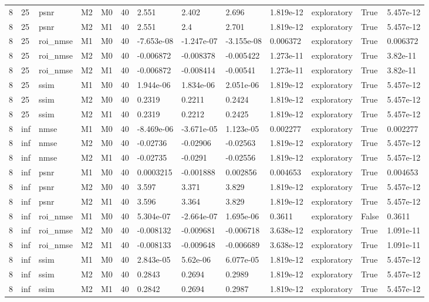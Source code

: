 \begin{tabular}{lllllllllllll}
8 & 25 & psnr & M2 & M0 & 40 & 2.551 & 2.402 & 2.696 & 1.819e-12 & exploratory & True & 5.457e-12 \\
8 & 25 & psnr & M2 & M1 & 40 & 2.551 & 2.4 & 2.701 & 1.819e-12 & exploratory & True & 5.457e-12 \\
8 & 25 & roi\_nmse & M1 & M0 & 40 & -7.653e-08 & -1.247e-07 & -3.155e-08 & 0.006372 & exploratory & True & 0.006372 \\
8 & 25 & roi\_nmse & M2 & M0 & 40 & -0.006872 & -0.008378 & -0.005422 & 1.273e-11 & exploratory & True & 3.82e-11 \\
8 & 25 & roi\_nmse & M2 & M1 & 40 & -0.006872 & -0.008414 & -0.00541 & 1.273e-11 & exploratory & True & 3.82e-11 \\
8 & 25 & ssim & M1 & M0 & 40 & 1.944e-06 & 1.834e-06 & 2.051e-06 & 1.819e-12 & exploratory & True & 5.457e-12 \\
8 & 25 & ssim & M2 & M0 & 40 & 0.2319 & 0.2211 & 0.2424 & 1.819e-12 & exploratory & True & 5.457e-12 \\
8 & 25 & ssim & M2 & M1 & 40 & 0.2319 & 0.2212 & 0.2425 & 1.819e-12 & exploratory & True & 5.457e-12 \\
8 & inf & nmse & M1 & M0 & 40 & -8.469e-06 & -3.671e-05 & 1.123e-05 & 0.002277 & exploratory & True & 0.002277 \\
8 & inf & nmse & M2 & M0 & 40 & -0.02736 & -0.02906 & -0.02563 & 1.819e-12 & exploratory & True & 5.457e-12 \\
8 & inf & nmse & M2 & M1 & 40 & -0.02735 & -0.0291 & -0.02556 & 1.819e-12 & exploratory & True & 5.457e-12 \\
8 & inf & psnr & M1 & M0 & 40 & 0.0003215 & -0.001888 & 0.002856 & 0.004653 & exploratory & True & 0.004653 \\
8 & inf & psnr & M2 & M0 & 40 & 3.597 & 3.371 & 3.829 & 1.819e-12 & exploratory & True & 5.457e-12 \\
8 & inf & psnr & M2 & M1 & 40 & 3.596 & 3.364 & 3.829 & 1.819e-12 & exploratory & True & 5.457e-12 \\
8 & inf & roi\_nmse & M1 & M0 & 40 & 5.304e-07 & -2.664e-07 & 1.695e-06 & 0.3611 & exploratory & False & 0.3611 \\
8 & inf & roi\_nmse & M2 & M0 & 40 & -0.008132 & -0.009681 & -0.006718 & 3.638e-12 & exploratory & True & 1.091e-11 \\
8 & inf & roi\_nmse & M2 & M1 & 40 & -0.008133 & -0.009648 & -0.006689 & 3.638e-12 & exploratory & True & 1.091e-11 \\
8 & inf & ssim & M1 & M0 & 40 & 2.843e-05 & 5.62e-06 & 6.077e-05 & 1.819e-12 & exploratory & True & 5.457e-12 \\
8 & inf & ssim & M2 & M0 & 40 & 0.2843 & 0.2694 & 0.2989 & 1.819e-12 & exploratory & True & 5.457e-12 \\
8 & inf & ssim & M2 & M1 & 40 & 0.2842 & 0.2694 & 0.2987 & 1.819e-12 & exploratory & True & 5.457e-12 \\
\hline
\end{tabular}
